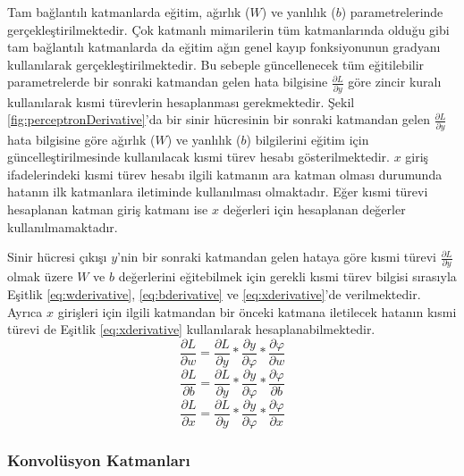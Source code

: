Tam bağlantılı katmanlarda eğitim, ağırlık ($W$) ve yanlılık ($b$) parametrelerinde gerçekleştirilmektedir. Çok katmanlı mimarilerin tüm katmanlarında olduğu gibi tam bağlantılı katmanlarda da eğitim ağın genel kayıp fonksiyonunun gradyanı kullanılarak gerçekleştirilmektedir. Bu sebeple güncellenecek tüm eğitilebilir parametrelerde bir sonraki katmandan gelen hata bilgisine $\frac{\partial L}{\partial  y}$ göre zincir kuralı kullanılarak kısmi türevlerin hesaplanması gerekmektedir. Şekil \ref{fig:perceptronDerivative}'da bir sinir hücresinin bir sonraki katmandan gelen $\frac{\partial L}{\partial  y}$ hata bilgisine göre ağırlık ($W$) ve  yanlılık ($b$) bilgilerini eğitim için güncelleştirilmesinde kullanılacak kısmi türev hesabı gösterilmektedir. $x$ giriş ifadelerindeki kısmi türev hesabı ilgili katmanın ara katman olması durumunda hatanın ilk katmanlara iletiminde kullanılması olmaktadır. Eğer kısmi türevi hesaplanan katman giriş katmanı ise $x$ değerleri için hesaplanan değerler kullanılmamaktadır.

Sinir hücresi çıkışı $y$'nin bir sonraki katmandan gelen hataya göre kısmi türevi $\frac{\partial L}{\partial  y}$ olmak üzere $W$ ve $b$ değerlerini eğitebilmek için gerekli kısmi türev bilgisi sırasıyla Eşitlik \ref{eq:wderivative}, \ref{eq:bderivative} ve \ref{eq:xderivative}'de verilmektedir. Ayrıca $x$ girişleri için ilgili katmandan bir önceki katmana iletilecek hatanın kısmi türevi de Eşitlik \ref{eq:xderivative} kullanılarak hesaplanabilmektedir.
\begin{equation}
	\label{eq:wderivative}
	\frac{\partial L}{\partial  w} = \frac{\partial L}{\partial  y}* \frac{\partial y}{\partial  \varphi} * \frac{\partial  \varphi}{\partial  w}
\end{equation}
\vspace{-1cm} 
\begin{equation}
	\label{eq:bderivative}
	\frac{\partial L}{\partial  b} = \frac{\partial L}{\partial  y}* \frac{\partial y}{\partial  \varphi} * \frac{\partial  \varphi}{\partial  b}
\end{equation} 
\vspace{-1cm}
\begin{equation}
	\label{eq:xderivative}
	\frac{\partial L}{\partial  x} = \frac{\partial L}{\partial  y}* \frac{\partial y}{\partial  \varphi} * \frac{\partial  \varphi}{\partial  x}
\end{equation} 

\subsubsection{Konvolüsyon Katmanları}

